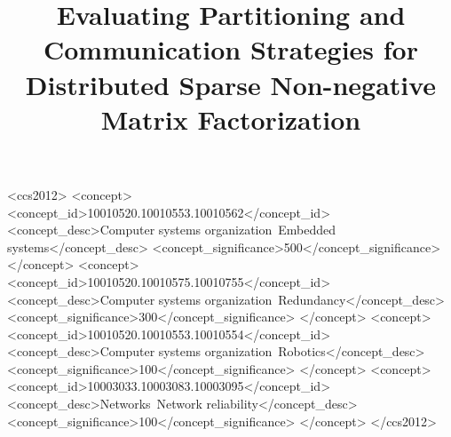 \documentclass[sigconf, review=true]{acmart}
\begin{document}
\title{Evaluating Partitioning and Communication Strategies for Distributed Sparse Non-negative Matrix Factorization}

%
%
\begin{CCSXML}
<ccs2012>
 <concept>
  <concept_id>10010520.10010553.10010562</concept_id>
  <concept_desc>Computer systems organization~Embedded systems</concept_desc>
  <concept_significance>500</concept_significance>
 </concept>
 <concept>
  <concept_id>10010520.10010575.10010755</concept_id>
  <concept_desc>Computer systems organization~Redundancy</concept_desc>
  <concept_significance>300</concept_significance>
 </concept>
 <concept>
  <concept_id>10010520.10010553.10010554</concept_id>
  <concept_desc>Computer systems organization~Robotics</concept_desc>
  <concept_significance>100</concept_significance>
 </concept>
 <concept>
  <concept_id>10003033.10003083.10003095</concept_id>
  <concept_desc>Networks~Network reliability</concept_desc>
  <concept_significance>100</concept_significance>
 </concept>
</ccs2012>  
\end{CCSXML}




\maketitle



%







%

 

%
\end{document}
